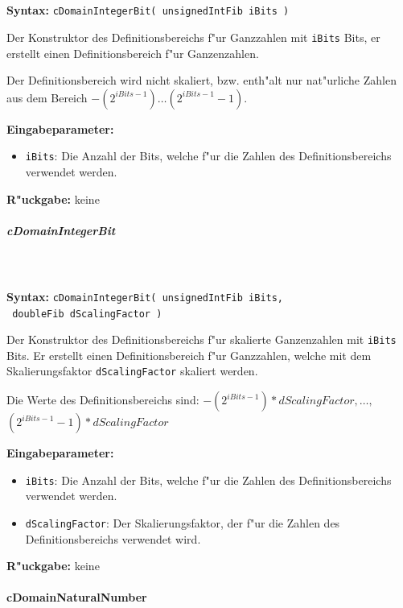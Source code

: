 \ \\\\\noindent
\textbf{Syntax:} \verb|cDomainIntegerBit( unsignedIntFib iBits )|

\bigskip\noindent
Der Konstruktor des Definitionsbereichs f"ur Ganzzahlen mit \verb|iBits| Bits, er erstellt einen Definitionsbereich f"ur Ganzenzahlen.

Der Definitionsbereich wird nicht skaliert, bzw. enth"alt nur nat"urliche Zahlen aus dem Bereich $-(2^{iBits-1}) \ldots (2^{iBits-1}-1)$.

\bigskip\noindent
\textbf{Eingabeparameter:}
\begin{itemize}
 \item \verb|iBits|: Die Anzahl der Bits, welche f"ur die Zahlen des Definitionsbereichs verwendet werden.
\end{itemize}

\bigskip\noindent
\textbf{R"uckgabe:} keine


\subparagraph{cDomainIntegerBit}

\ \\\\\noindent
\textbf{Syntax:} \verb|cDomainIntegerBit( unsignedIntFib iBits,| \\\verb| doubleFib dScalingFactor )|

\bigskip\noindent
Der Konstruktor des Definitionsbereichs f"ur skalierte Ganzenzahlen mit \verb|iBits| Bits. Er erstellt einen Definitionsbereich f"ur Ganzzahlen, welche mit dem Skalierungsfaktor \verb|dScalingFactor| skaliert werden.

\bigskip\noindent
Die Werte des Definitionsbereichs sind: $-(2^{iBits-1})*dScalingFactor, \ldots ,$\\ $(2^{iBits-1}-1)*dScalingFactor$

\bigskip\noindent
\textbf{Eingabeparameter:}
\begin{itemize}
 \item \verb|iBits|: Die Anzahl der Bits, welche f"ur die Zahlen des Definitionsbereichs verwendet werden.
 \item \verb|dScalingFactor|: Der Skalierungsfaktor, der f"ur die Zahlen des Definitionsbereichs verwendet wird.
\end{itemize}

\bigskip\noindent
\textbf{R"uckgabe:} keine



\paragraph{cDomainNaturalNumber}


